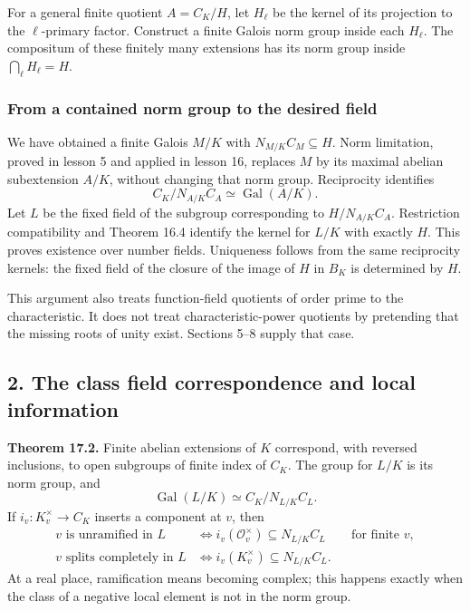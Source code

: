 \documentclass[11pt,a4paper]{article}
\begin{document}
For a general finite quotient \(A=C_K/H\), let \(H_\ell\) be the kernel
of its projection to the \(\ell\)-primary factor. Construct a finite
Galois norm group inside each \(H_\ell\). The compositum of these
finitely many extensions has its norm group inside
\(\bigcap_\ell H_\ell=H\).

\subsubsection{From a contained norm group to the desired
field}\label{from-a-contained-norm-group-to-the-desired-field}

We have obtained a finite Galois \(M/K\) with \(N_{M/K}C_M\subseteq H\).
Norm limitation, proved in lesson 5 and applied in lesson 16, replaces
\(M\) by its maximal abelian subextension \(A/K\), without changing that
norm group. Reciprocity identifies \[
C_K/N_{A/K}C_A\simeq\operatorname{Gal}(A/K).
\] Let \(L\) be the fixed field of the subgroup corresponding to
\(H/N_{A/K}C_A\). Restriction compatibility and Theorem 16.4 identify
the kernel for \(L/K\) with exactly \(H\). This proves existence over
number fields. Uniqueness follows from the same reciprocity kernels: the
fixed field of the closure of the image of \(H\) in \(B_K\) is
determined by \(H\).

This argument also treats function-field quotients of order prime to the
characteristic. It does not treat characteristic-power quotients by
pretending that the missing roots of unity exist. Sections 5--8 supply
that case.

\subsection{2. The class field correspondence and local
information}\label{the-class-field-correspondence-and-local-information}

\textbf{Theorem 17.2.} Finite abelian extensions of \(K\) correspond,
with reversed inclusions, to open subgroups of finite index of \(C_K\).
The group for \(L/K\) is its norm group, and \[
\operatorname{Gal}(L/K)\simeq C_K/N_{L/K}C_L.
\tag{6}
\] If \(i_v:K_v^\times\to C_K\) inserts a component at \(v\), then \[
\begin{aligned}
v\text{ is unramified in }L&\iff i_v(\mathcal O_v^\times)\subseteq N_{L/K}C_L
&&\text{for finite }v,\\
v\text{ splits completely in }L&\iff i_v(K_v^\times)\subseteq N_{L/K}C_L.
\end{aligned}
\tag{7}
\] At a real place, ramification means becoming complex; this happens
exactly when the class of a negative local element is not in the norm
group.
\end{document}

